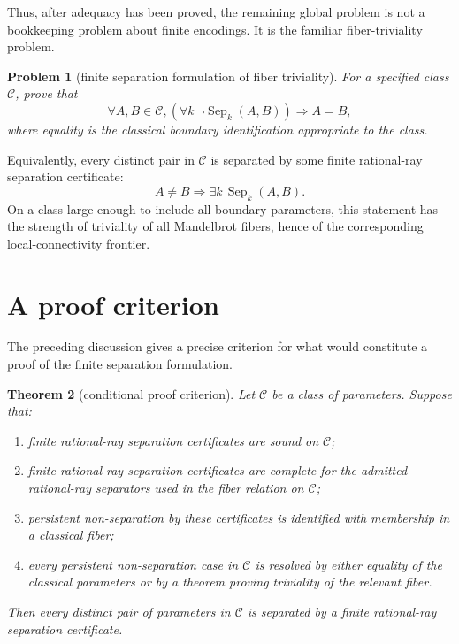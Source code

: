\documentclass[11pt]{amsart}
\newtheorem{theorem}{Theorem}[section]
\newtheorem{problem}[theorem]{Problem}
\begin{document}
Thus, after adequacy has been proved, the remaining global problem is not a bookkeeping problem about finite encodings.  It is the familiar fiber-triviality problem.

\begin{problem}[finite separation formulation of fiber triviality]
For a specified class \(\mathcal C\), prove that
\[
        \forall A,B\in\mathcal C,
        \left(\forall k\,\neg\operatorname{Sep}_k(A,B)\right)
        \Longrightarrow A=B,
\]
where equality is the classical boundary identification appropriate to the class.
\end{problem}

Equivalently, every distinct pair in \(\mathcal C\) is separated by some finite rational-ray separation certificate:
\[
        A\ne B \Longrightarrow \exists k\,\operatorname{Sep}_k(A,B).
\]
On a class large enough to include all boundary parameters, this statement has the strength of triviality of all Mandelbrot fibers, hence of the corresponding local-connectivity frontier.

\section{A proof criterion}

The preceding discussion gives a precise criterion for what would constitute a proof of the finite separation formulation.

\begin{theorem}[conditional proof criterion]
Let \(\mathcal C\) be a class of parameters.  Suppose that:
\begin{enumerate}[label=(\alph*)]
\item finite rational-ray separation certificates are sound on \(\mathcal C\);
\item finite rational-ray separation certificates are complete for the admitted rational-ray separators used in the fiber relation on \(\mathcal C\);
\item persistent non-separation by these certificates is identified with membership in a classical fiber;
\item every persistent non-separation case in \(\mathcal C\) is resolved by either equality of the classical parameters or by a theorem proving triviality of the relevant fiber.
\end{enumerate}
Then every distinct pair of parameters in \(\mathcal C\) is separated by a finite rational-ray separation certificate.
\end{theorem}
\end{document}
